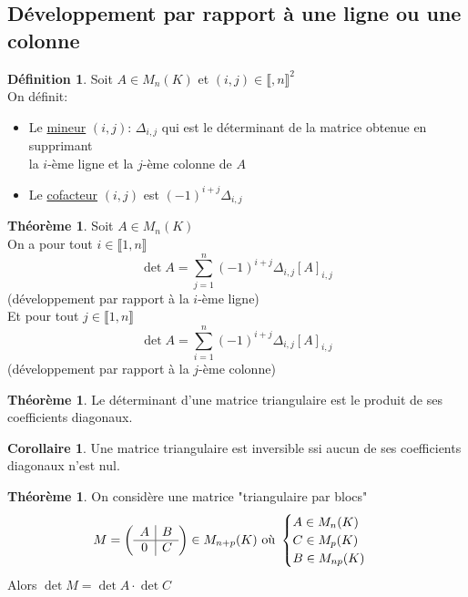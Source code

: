 \documentclass[10pt,a4paper]{article}
\theoremstyle{definition}
\newtheorem{theorem}[proposition]{Théorème}
\newtheorem{corollaire}[proposition]{Corollaire}
\newtheorem{definition}[proposition]{Définition}
\begin{document}
\subsection{Développement par rapport à une ligne ou une colonne}
\begin{definition}
Soit $A \in M_n(K)$ et $(i, j) \in \llbracket , n \rrbracket^2$ \\
On définit:
\begin{itemize}
\item Le \uline{mineur} $(i, j)$: $\Delta_{i, j}$ qui est le déterminant de la matrice obtenue en supprimant \\
la $i$-ème ligne et la $j$-ème colonne de $A$
\item Le \uline{cofacteur} $(i, j)$ est $(-1)^{i + j} \Delta_{i, j}$
\end{itemize}
\end{definition}
\begin{theorem}
Soit $A \in M_n(K)$ \\
On a pour tout $i \in \llbracket 1, n \rrbracket$
\[ \det A = \sum_{j = 1}^n (-1)^{i + j} \Delta_{i, j} [A]_{i, j} \]
(développement par rapport à la $i$-ème ligne) \\
Et pour tout $j \in \llbracket 1, n \rrbracket$
\[ \det A = \sum_{i = 1}^n (-1)^{i + j} \Delta_{i, j} [A]_{i, j} \]
(développement par rapport à la $j$-ème colonne)
\end{theorem}
\begin{theorem}
Le déterminant d'une matrice triangulaire est le produit de ses coefficients diagonaux.
\end{theorem}
\begin{corollaire}
Une matrice triangulaire est inversible ssi aucun de ses coefficients diagonaux n'est nul.
\end{corollaire}
\begin{theorem}
On considère une matrice "triangulaire par blocs" 
\[M = \left(\begin{array}{c | c}
A & B \\
\hline
0 & C \\
\end{array}\right) \in M_{n + p}(K) \text{ où } \begin{cases}
A \in M_n(K) \\ C \in M_p(K) \\ B \in M_{np}(K)
\end{cases}\]
Alors $\det M = \det A \cdot \det C$
\end{theorem}
\end{document}
